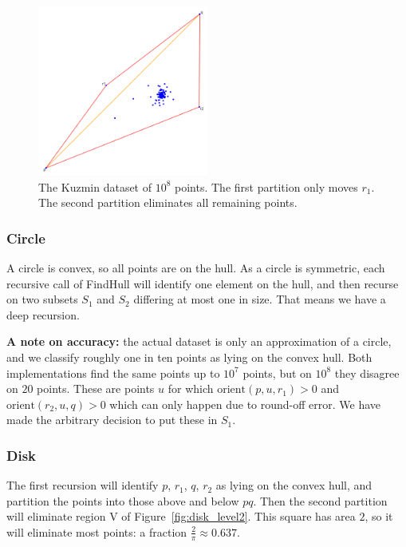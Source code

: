 \begin{figure}[ht]
    \centering
    \includegraphics[width=0.5\textwidth]{./figures/rust-kuzmin.png}
    \caption{The Kuzmin dataset of $10^8$ points. The first partition only
             moves $r_1$. The second partition eliminates all remaining points.}
    \label{fig:kuzmin}
\end{figure}

\subsubsection{Circle}

A circle is convex, so all points are on the hull. As a circle is symmetric,
each recursive call of FindHull will identify one element on the hull, and
then recurse on two subsets $S_1$ and $S_2$ differing at most one in size.
That means we have a deep recursion.

\textbf{A note on accuracy: }the actual dataset is only an approximation of
a circle, and we classify roughly one in ten points as lying on the convex
hull. Both implementations find the same points up to $10^7$ points, but on 
$10^8$ they disagree on $20$ points. These are points $u$ for which 
$\text{orient}(p, u, r_1) > 0$ and $\text{orient}(r_2, u, q) > 0$ which
can only happen due to round-off error. We have made the arbitrary decision
to put these in $S_1$.

\subsubsection{Disk}

The first recursion will identify $p$, $r_1$, $q$, $r_2$ as lying on the
convex hull, and partition the points into those above and below $pq$.
Then the second partition will eliminate region V of 
Figure~\ref{fig:disk_level2}. This square has area $2$, so it will eliminate
most points: a fraction $\frac{2}{\pi} \approx 0.637$.

